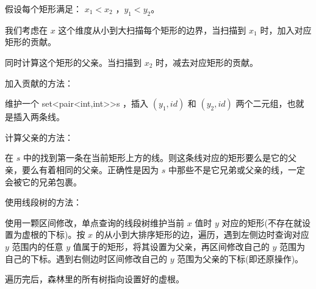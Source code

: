 假设每个矩形满足： $x_1<x_2$ ，$y_1<y_2$。

我们考虑在 $x$ 这个维度从小到大扫描每个矩形的边界，当扫描到 $x_1$ 时，加入对应矩形的贡献。

同时计算这个矩形的父亲。当扫描到 $x_2$ 时，减去对应矩形的贡献。

加入贡献的方法：

维护一个 set<pair<int,int>>s ，插入 $(y_1,id)$ 和 $(y_2,id)$ 两个二元组，也就是插入两条线。

计算父亲的方法：

在 $s$ 中的找到第一条在当前矩形上方的线。则这条线对应的矩形要么是它的父亲，要么有着相同的父亲。正确性是因为 $s$ 中那些不是它兄弟或父亲的线，一定会被它的兄弟包裹。

使用线段树的方法：

使用一颗区间修改，单点查询的线段树维护当前 $x$ 值时 $y$ 对应的矩形(不存在就设置为虚根的下标)。按 $x$  的从小到大排序矩形的边，遍历，遇到左侧边时查询对应 $y$ 范围内的任意 $y$ 值属于的矩形，将其设置为父亲，再区间修改自己的 $y$  范围为自己的下标。遇到右侧边时区间修改自己的 $y$ 范围为父亲的下标(即还原操作)。

遍历完后，森林里的所有树指向设置好的虚根。